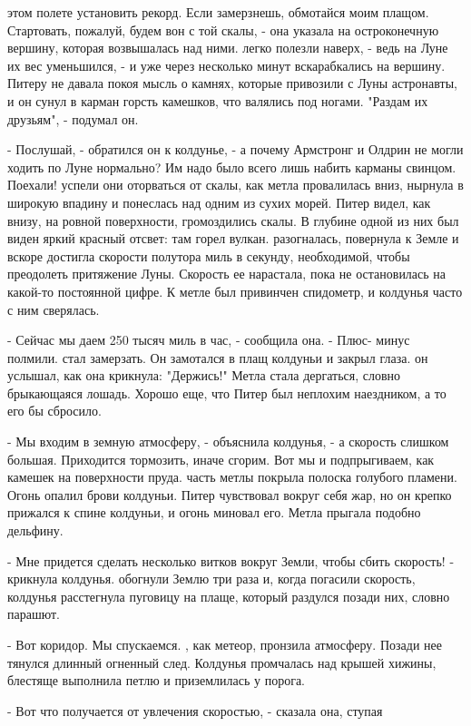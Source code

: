 этом полете установить рекорд. Если замерзнешь, обмотайся моим плащом. 
Стартовать, пожалуй, будем вон с той скалы, - она указала на 
остроконечную вершину, которая возвышалась над ними.
 легко полезли наверх, - ведь на Луне их вес уменьшился, - и 
уже через несколько минут вскарабкались на вершину. Питеру не давала 
покоя мысль о камнях, которые привозили с Луны астронавты, и он сунул 
в карман горсть камешков, что валялись под ногами. "Раздам их 
друзьям", - подумал он.
\par- Послушай, - обратился он к колдунье, - а почему Армстронг и 
Олдрин не могли ходить по Луне нормально? Им надо было всего лишь 
набить карманы свинцом. Поехали!
 успели они оторваться от скалы, как метла провалилась вниз, 
нырнула в широкую впадину и понеслась над одним из сухих морей. Питер 
видел, как внизу, на ровной поверхности, громоздились скалы. В глубине 
одной из них был виден яркий красный отсвет: там горел вулкан.
 разогналась, повернула к Земле и вскоре достигла скорости 
полутора миль в секунду, необходимой, чтобы преодолеть притяжение 
Луны. Скорость ее нарастала, пока не остановилась на какой-то 
постоянной цифре. К метле был привинчен спидометр, и колдунья часто с 
ним сверялась.
\par- Сейчас мы даем 250 тысяч миль в час, - сообщила она. - Плюс-
минус полмили.
 стал замерзать. Он замотался в плащ колдуньи и закрыл глаза.
 он услышал, как она крикнула: "Держись!" Метла стала 
дергаться, словно брыкающаяся лошадь. Хорошо еще, что Питер был 
неплохим наездником, а то его бы сбросило.
\par- Мы входим в земную атмосферу, - объяснила колдунья, - а скорость 
слишком большая. Приходится тормозить, иначе сгорим. Вот мы и 
подпрыгиваем, как камешек на поверхности пруда.
 часть метлы покрыла полоска голубого пламени. Огонь 
опалил брови колдуньи. Питер чувствовал вокруг себя жар, но он крепко 
прижался к спине колдуньи, и огонь миновал его. Метла прыгала подобно 
дельфину.
\par- Мне придется сделать несколько витков вокруг Земли, чтобы сбить 
скорость! - крикнула колдунья.
 обогнули Землю три раза и, когда погасили скорость, колдунья 
расстегнула пуговицу на плаще, который раздулся позади них, словно 
парашют.
\par- Вот коридор. Мы спускаемся.
, как метеор, пронзила атмосферу. Позади нее тянулся длинный 
огненный след. Колдунья промчалась над крышей хижины, блестяще 
выполнила петлю и приземлилась у порога.
\par- Вот что получается от увлечения скоростью, - сказала она, ступая 
